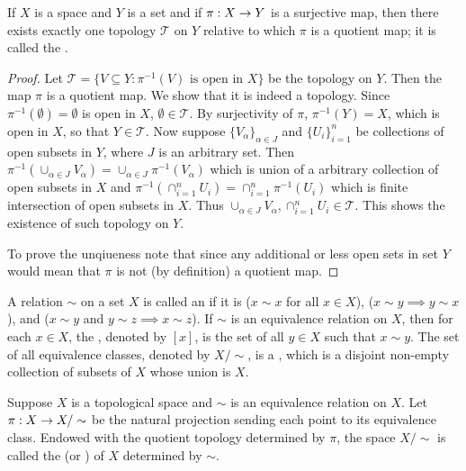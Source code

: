 \documentclass[11pt,a4paper]{article}
\begin{document}
\begin{proposition}\label{prop:quotient_topology_uniqueness}
If $X$ is a space and $Y$ is a set and if $\pi:X\rightarrow Y$ is a surjective map, then there exists exactly one topology $\mathcal{T}$ on $Y$ relative to which $\pi$ is a quotient map; it is called the .
\end{proposition}

\begin{proof}
Let $\mathcal{T} = \{V\subseteq Y: \pi^{-1}(V) \text{ is open in } X\}$ be the topology on $Y$. Then the map $\pi$ is a quotient map. We show that it is indeed a topology. Since $\pi^{-1}(\emptyset) = \emptyset$ is open in $X$, $\emptyset\in \mathcal{T}$. By surjectivity of $\pi$, $\pi^{-1}(Y) = X$, which is open in $X$, so that $Y\in \mathcal{T}$. Now suppose $\{V_\alpha\}_{\alpha\in J}$ and $\{U_i\}_{i=1}^n$ be collections of open subsets in $Y$, where $J$ is an arbitrary set. Then $\pi^{-1}(\cup_{\alpha\in J} V_\alpha) = \cup_{\alpha\in J}\pi^{-1}(V_\alpha)$ which is union of a arbitrary collection of open subsets in $X$ and $\pi^{-1}(\cap_{i=1}^n U_i) = \cap_{i=1}^n\pi^{-1}(U_i)$ which is finite intersection of open subsets in $X$. Thus $\cup_{\alpha\in J} V_\alpha,\cap_{i=1}^n U_i\in \mathcal{T}$. This shows the existence of such topology on $Y$.

To prove the unqiueness note that since any additional
or less open sets in set $Y$ would mean that $\pi$ is not (by definition) a quotient map.
\end{proof}

A relation $\sim$ on a set $X$ is called an  if it is ($x\sim x$ for all $x\in X$), ($x\sim y\implies y\sim x$), and ($x\sim y$ and $y\sim z\implies x\sim z$). If $\sim$ is an equivalence relation on $X$, then for each $x\in X$, the , denoted by $[x]$, is the set of all $y\in X$ such that $x\sim y$. The set of all equivalence classes, denoted by $X/\sim$, is a , which is a disjoint non-empty collection of subsets of $X$ whose union is $X$.

\begin{definition}
Suppose $X$ is a topological space and $\sim$ is an equivalence relation on $X$. Let $\pi:X\rightarrow X/\sim$ be the natural projection sending each point to its equivalence class. Endowed with the quotient topology determined by $\pi$, the space $X/\sim$ is called the  (or ) of $X$ determined by $\sim$.
\end{definition}
\end{document}
